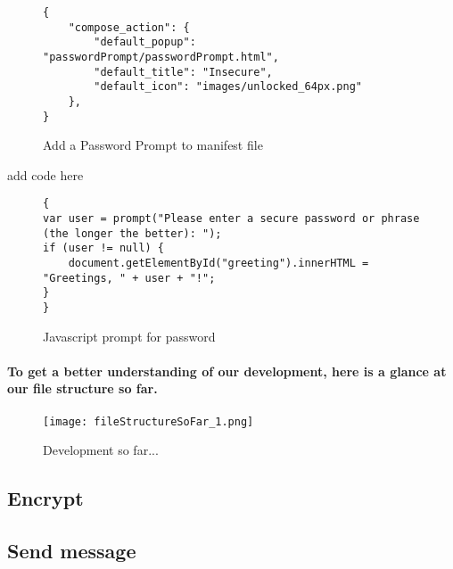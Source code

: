 \begin{figure}[H]
\centering
\begin{verbatim}
{
    "compose_action": {
        "default_popup": "passwordPrompt/passwordPrompt.html",
        "default_title": "Insecure",
        "default_icon": "images/unlocked_64px.png"
    },
}
\end{verbatim}
\caption{\label{fig: addPwToManifest} Add a Password Prompt to manifest file}
\end{figure}

add code here
\begin{figure}[H]
\centering
\begin{verbatim}
{
var user = prompt("Please enter a secure password or phrase (the longer the better): ");
if (user != null) {
    document.getElementById("greeting").innerHTML = "Greetings, " + user + "!";
}
}
\end{verbatim}
\caption{\label{fig: pwPrompt} Javascript prompt for password}
\end{figure}

\paragraph{To get a better understanding of our development, here is a glance at our file structure so far.}

\begin{figure}[H]
    \centering
    \texttt{[image: fileStructureSoFar\_1.png]}
    \caption{\label{fig: folderStructure1} Development so far...}
\end{figure}



\subsection{Encrypt}
\subsection{Send message}

